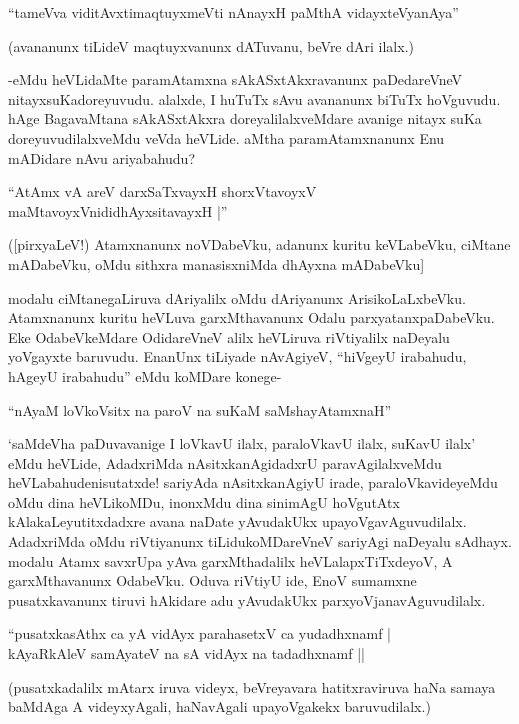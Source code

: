 \begin{shloka}
``tameVva viditAvx\s timaqtuyxmeVti nAnayxH paMthA vidayxteV\s yanAya''
\end{shloka}

(avananunx tiLideV maqtuyxvanunx dATuvanu, beVre dAri ilalx.)

-eMdu heVLidaMte paramAtamxna sAkASxtAkxravanunx paDedareVneV nitayxsuKadoreyuvudu. alalxde, I huTuTx sAvu avananunx biTuTx hoVguvudu. hAge BagavaMtana sAkASxtAkxra doreyalilalxveMdare avanige nitayx suKa doreyuvudilalxveMdu veVda heVLide. aMtha paramAtamxnanunx Enu mADidare nAvu ariyabahudu?

\begin{shloka}
``AtAmx vA areV darxSaTxvayxH shorxVtavoyxV\\
maMtavoyxVnididhAyxsitavayxH |''
\end{shloka}

([pirxyaLeV!) Atamxnanunx noVDabeVku, adanunx kuritu keVLabeVku, ciMtane mADabeVku, oMdu sithxra manasisxniMda dhAyxna mADabeVku]

modalu ciMtanegaLiruva dAriyalilx oMdu dAriyanunx ArisikoLaLxbeVku. Atamxnanunx kuritu heVLuva garxMthavanunx Odalu parxyatanxpaDabeVku. Eke OdabeVkeMdare OdidareVneV alilx heVLiruva riVtiyalilx naDeyalu yoVgayxte baruvudu. EnanUnx tiLiyade nAvAgiyeV, ``hiVgeyU irabahudu, hAgeyU irabahudu'' eMdu koMDare konege-

\begin{shloka}
``nAyaM loVkoV\s sitx na paroV na suKaM saMshayAtamxnaH''
\end{shloka}

`saMdeVha paDuvavanige I loVkavU ilalx, paraloVkavU ilalx, suKavU ilalx' eMdu heVLide, AdadxriMda nAsitxkanAgidadxrU paravAgilalxveMdu heVLabahudenisutatxde! sariyAda nAsitxkanAgiyU irade, paraloVkavideyeMdu oMdu dina heVLikoMDu, inonxMdu dina sinimAgU hoVgutAtx kAlakaLeyutitxdadxre avana naDate yAvudakUkx upayoVgavAguvudilalx. AdadxriMda oMdu riVtiyanunx tiLidukoMDareVneV sariyAgi naDeyalu sAdhayx. modalu Atamx savxrUpa yAva garxMthadalilx heVLalapxTiTxdeyoV, A garxMthavanunx OdabeVku. Oduva riVtiyU ide, EnoV sumamxne pusatxkavanunx tiruvi hAkidare adu yAvudakUkx parxyoVjanavAguvudilalx.

\begin{shloka}
``pusatxkasAthx ca yA vidAyx parahasetxV ca yudadhxnamf |\\
kAyaRkAleV samAyateV na sA vidAyx na tadadhxnamf ||
\end{shloka}

(pusatxkadalilx mAtarx iruva videyx, beVreyavara hatitxraviruva haNa samaya baMdAga A videyxyAgali, haNavAgali upayoVgakekx baruvudilalx.)

